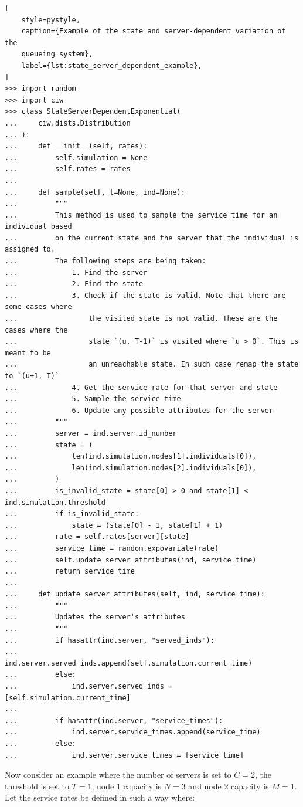\begin{lstlisting}[
    style=pystyle,
    caption={Example of the state and server-dependent variation of the
    queueing system},
    label={lst:state_server_dependent_example},
]
>>> import random
>>> import ciw
>>> class StateServerDependentExponential(
...     ciw.dists.Distribution
... ):
...     def __init__(self, rates):
...         self.simulation = None
...         self.rates = rates
... 
...     def sample(self, t=None, ind=None):
...         """
...         This method is used to sample the service time for an individual based
...         on the current state and the server that the individual is assigned to.
...         The following steps are being taken:
...             1. Find the server
...             2. Find the state
...             3. Check if the state is valid. Note that there are some cases where
...                 the visited state is not valid. These are the cases where the
...                 state `(u, T-1)` is visited where `u > 0`. This is meant to be
...                 an unreachable state. In such case remap the state to `(u+1, T)`
...             4. Get the service rate for that server and state
...             5. Sample the service time
...             6. Update any possible attributes for the server
...         """
...         server = ind.server.id_number
...         state = (
...             len(ind.simulation.nodes[1].individuals[0]),
...             len(ind.simulation.nodes[2].individuals[0]),
...         )
...         is_invalid_state = state[0] > 0 and state[1] < ind.simulation.threshold
...         if is_invalid_state:
...             state = (state[0] - 1, state[1] + 1)
...         rate = self.rates[server][state]
...         service_time = random.expovariate(rate)
...         self.update_server_attributes(ind, service_time)
...         return service_time
... 
...     def update_server_attributes(self, ind, service_time):
...         """
...         Updates the server's attributes
...         """
...         if hasattr(ind.server, "served_inds"):
...             ind.server.served_inds.append(self.simulation.current_time)
...         else:
...             ind.server.served_inds = [self.simulation.current_time]
... 
...         if hasattr(ind.server, "service_times"):
...             ind.server.service_times.append(service_time)
...         else:
...             ind.server.service_times = [service_time]

\end{lstlisting}

Now consider an example where the number of servers is set to \(C = 2\), the
threshold is set to \(T = 1\), node 1 capacity is \(N = 3\) and node 2 capacity
is \(M = 1\).
Let the service rates be defined in such a way where:

